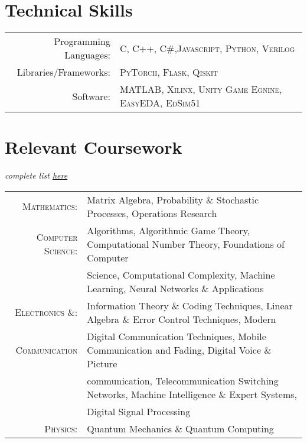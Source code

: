 \documentclass[a4paper,10pt]{article}
\def \siteurl{https://manideepmamindlapally.ninja}
\begin{document}
\section{Technical Skills}
\begin{tabular}{rl}
	Programming Languages:& \textsc{C}, \textsc{C++}, \textsc{C\#},\textsc{Javascript}, \textsc{Python}, \textsc{Verilog}\\
	Libraries/Frameworks:& \textsc{PyTorch}, \textsc{Flask}, \textsc{Qiskit}\\
	Software: & \textsc{MATLAB}, \textsc{Xilinx}, \textsc{Unity Game Egnine}, \textsc{EasyEDA}, \textsc{EdSim51}
\end{tabular}

\section{Relevant Coursework}
\begin{flushleft}
	\footnotesize{ \textit{complete list \href{\siteurl /assets/files/Grade_Card_IIT.pdf}{here}}}
\end{flushleft}
\small
\begin{tabular}{rl}
	\textsc{Mathematics}:& Matrix Algebra, Probability \& Stochastic Processes, Operations Research \\
	\textsc{Computer Science}:& Algorithms, Algorithmic Game Theory, Computational Number Theory, Foundations of Computer \\ & Science,  Computational Complexity, Machine Learning, Neural Networks \& Applications\\
	\textsc{Electronics \&}: & Information Theory \& Coding Techniques, Linear Algebra \& Error Control Techniques, Modern \\
	\textsc{Communication} &  Digital Communication Techniques, Mobile Communication and Fading, Digital Voice \& Picture \\ & communication, Telecommunication Switching Networks, Machine Intelligence \& Expert Systems, \\ & Digital Signal Processing \\
	\textsc{Physics}: & Quantum Mechanics \& Quantum Computing
\end{tabular}
 
\end{document}
